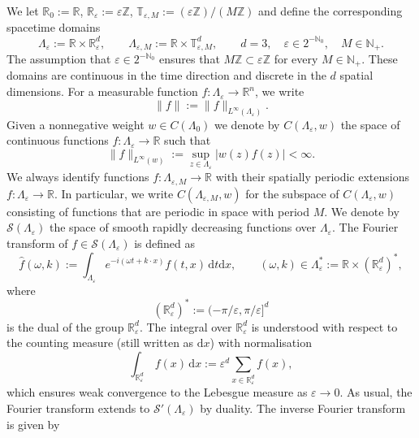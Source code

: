 \documentclass{article}
\numberwithin{equation}{section}
\newcommand{\assign}{:=}
\newcommand{\mathd}{\mathrm{d}}
\theoremstyle{plain}
\theoremstyle{definition}
\begin{document}
We let $\mathbb{R}_0 \assign \mathbb{R}$, $\mathbb{R}_{\varepsilon} \assign
\varepsilon \mathbb{Z}$, $\mathbb{T}_{\varepsilon, M} \assign
(\varepsilon \mathbb{Z}) / (M\mathbb{Z})$ and define the corresponding
spacetime domains
\[ \Lambda_{\varepsilon} \assign \mathbb{R} \times
   \mathbb{R}_{\varepsilon}^d, \qquad \Lambda_{\varepsilon, M} \assign
   \mathbb{R} \times \mathbb{T}_{\varepsilon, M}^d, \qquad d = 3, \quad
   \varepsilon \in 2^{-\mathbb{N}_0}, \quad M \in \mathbb{N}_+ . \]
The assumption that $\varepsilon \in 2^{-\mathbb{N}_0}$ ensures that
$M\mathbb{Z} \subset \varepsilon \mathbb{Z}$ for every $M \in \mathbb{N}_+$.
These domains are continuous in the time direction and discrete in the $d$
spatial dimensions. For a measurable function $f : \Lambda_{\varepsilon}
\rightarrow \mathbb{R}^n$, we write
\[ \| f \| \assign \| f \|_{L^{\infty} (\Lambda_{\varepsilon})} . \]
Given a nonnegative weight $w \in C (\Lambda_0)$ we denote by $C
(\Lambda_{\varepsilon}, w)$ the space of continuous functions $f :
\Lambda_{\varepsilon} \rightarrow \mathbb{R}$ such that
\[ \| f \|_{L^{\infty} (w)} \assign \sup_{z \in \Lambda_{\varepsilon}} | w (z)
   f (z) | < \infty . \]
We always identify functions $f : \Lambda_{\varepsilon, M} \rightarrow
\mathbb{R}$ with their spatially periodic extensions $f :
\Lambda_{\varepsilon} \rightarrow \mathbb{R}$. In particular, we write $C
(\Lambda_{\varepsilon, M}, w)$ for the subspace of $C (\Lambda_{\varepsilon},
w)$ consisting of functions that are periodic in space with period $M$. We
denote by $\mathcal{S} (\Lambda_{\varepsilon})$ the space of smooth rapidly
decreasing functions over $\Lambda_{\varepsilon}$. The Fourier transform of $f
\in \mathcal{S} (\Lambda_{\varepsilon})$ is defined as
\[ \hat{f} (\omega, k) \assign \int_{\Lambda_{\varepsilon}} e^{- i (\omega t +
   k \cdot x)} f (t, x)\,\mathd t \mathd x, \qquad (\omega, k) \in
   \Lambda_{\varepsilon}^{\ast} \assign \mathbb{R} \times
   (\mathbb{R}_{\varepsilon}^d)^{\ast}, \]
where
\[ (\mathbb{R}_{\varepsilon}^d)^{\ast} \assign (- \pi / \varepsilon, \pi /
   \varepsilon]^d \]
is the dual of the group $\mathbb{R}_{\varepsilon}^d$. The integral over
$\mathbb{R}_{\varepsilon}^d$ is understood with respect to the counting measure
(still written as $\mathd x$) with normalisation
\[ \int_{\mathbb{R}_{\varepsilon}^d} \, f (x)\,\mathd x \assign \varepsilon^d
   \sum_{x \in \mathbb{R}^d_{\varepsilon}} f (x), \]
which ensures weak convergence to the Lebesgue measure as $\varepsilon
\rightarrow 0$. As usual, the Fourier transform extends to $\mathcal{S}'
(\Lambda_{\varepsilon})$ by duality. The inverse Fourier transform is given by
\end{document}
